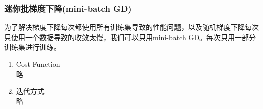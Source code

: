 \subsubsection{迷你批梯度下降(mini-batch GD)}
为了解决梯度下降每次都使用所有训练集导致的性能问题，以及随机梯度下降每次只使用一个数据导致的收敛太慢，我们可以只用mini-batch GD。每次只用一部分训练集进行训练。
\begin{enumerate}
	\item Cost Function \\
	略

	\item 迭代方式 \\
	略
\end{enumerate}










